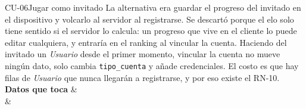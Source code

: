 \begin{fichacu}{CU-06}{Jugar como invitado}
{    La alternativa era guardar el progreso del invitado en el dispositivo y volcarlo al servidor al registrarse. Se descartó porque el elo solo tiene sentido si el servidor lo calcula: un progreso que vive en el cliente lo puede editar cualquiera, y entraría en el ranking al vincular la cuenta. Haciendo del invitado un \textit{Usuario} desde el primer momento, vincular la cuenta no mueve ningún dato, solo cambia \texttt{tipo\_\allowbreak{}cuenta} y añade credenciales. El costo es que hay filas de \textit{Usuario} que nunca llegarán a registrarse, y por eso existe el \mbox{RN-10}.} \\ \hline
  \textbf{Datos que toca} &  \\
   &  \\ \hline
\end{fichacu}
\clearpage
